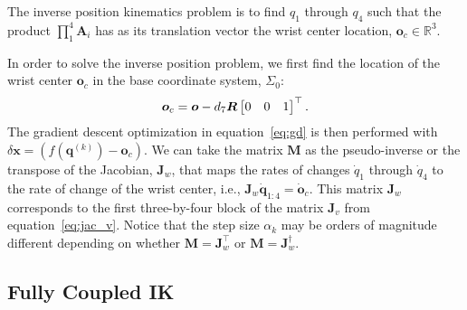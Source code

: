 The inverse position kinematics problem is to find $q_1$ through $q_4$ such
that the product $\prod_1^4 \bm{A}_i$ has as its translation vector the wrist
center location, $\bm{o}_c \in \mathbb{R}^3$.

In order to solve the inverse position problem, we first find the location of
the wrist center $\bm{o}_c$ in the base coordinate system,
$\Sigma_0$: \[ \bm{o}_c = \bm{o} - d_7 \bm{R} \begin{bmatrix}0 & 0 & 1\end{bmatrix}^\top. \]
%
The gradient descent optimization in equation~\eqref{eq:gd} is then performed 
with $\delta \bm{x} = \left(f\left(\bm{q}^{(k)}\right) - \bm{o}_c \right)$.
We can take the matrix $\bm{M}$ as the pseudo-inverse or the transpose
of the Jacobian, $\bm{J}_w$, that maps the rates of changes $\dot{q}_1$ through
$\dot{q}_4$ to the rate of change of the wrist center, i.e., $\bm{J}_w
\dot{\bm{q}}_{1:4} = \dot{\bm{o}}_c$. This matrix $\bm{J}_w$ corresponds to the 
first three-by-four block of the matrix $\bm{J}_v$ from equation~\eqref{eq:jac_v}. 
%
Notice that the step size $\alpha_k$ may be orders of magnitude different
depending on whether $\bm{M} = \bm{J}_w^\top$ or $\bm{M} = \bm{J}_w^\dagger$. 


\subsection{Fully Coupled IK}
\label{ssec:ik_full}